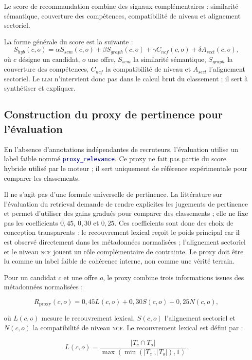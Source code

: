 \documentclass[12pt,twoside]{report}
\newcommand{\filevar}[1]{\texttt{\textcolor{darkblue}{#1}}}
\newcommand{\NCF}{\textsc{ncf}}
\newcommand{\LLM}{\textsc{llm}}
\begin{document}
Le score de recommandation combine des signaux complémentaires : similarité sémantique, couverture des compétences, compatibilité de niveau et alignement sectoriel.

La forme générale du score est la suivante :
\[
S_{hyb}(c,o)=\alpha S_{sem}(c,o)+\beta S_{graph}(c,o)+\gamma C_{ncf}(c,o)+\delta A_{sect}(c,o),
\]
où $c$ désigne un candidat, $o$ une offre, $S_{sem}$ la similarité sémantique, $S_{graph}$ la couverture des compétences, $C_{ncf}$ la compatibilité de niveau et $A_{sect}$ l'alignement sectoriel. Le \LLM{} n'intervient donc pas dans le calcul brut du classement ; il sert à synthétiser et expliquer.

\subsection{Construction du proxy de pertinence pour l'évaluation}

En l'absence d'annotations indépendantes de recruteurs, l'évaluation utilise un label faible nommé \filevar{proxy\_relevance}. Ce proxy ne fait pas partie du score hybride utilisé par le moteur ; il sert uniquement de référence expérimentale pour comparer les classements.

Il ne s'agit pas d'une formule universelle de pertinence. La littérature sur l'évaluation du retrieval demande de rendre explicites les jugements de pertinence et permet d'utiliser des gains gradués pour comparer des classements \cite{thakur2021beir,muennighoff2022mteb} ; elle ne fixe pas les coefficients $0{,}45$, $0{,}30$ et $0{,}25$. Ces coefficients sont donc des choix de conception transparents : le recouvrement lexical reçoit le poids principal car il est observé directement dans les métadonnées normalisées ; l'alignement sectoriel et le niveau \NCF{} jouent un rôle complémentaire de contrainte. Le proxy doit être lu comme un label faible de cohérence interne, non comme une vérité terrain.

Pour un candidat $c$ et une offre $o$, le proxy combine trois informations issues des métadonnées normalisées :

\[
R_{\mathrm{proxy}}(c,o)
=0{,}45L(c,o)+0{,}30S(c,o)+0{,}25N(c,o),
\]

\noindent où $L(c,o)$ mesure le recouvrement lexical, $S(c,o)$ l'alignement sectoriel et $N(c,o)$ la compatibilité de niveau \NCF{}. Le recouvrement lexical est défini par :

\[
L(c,o)=
\frac{\left|T_c\cap T_o\right|}
{\max\!\left(\min\!\left(|T_c|,|T_o|\right),1\right)}.
\]
\end{document}
